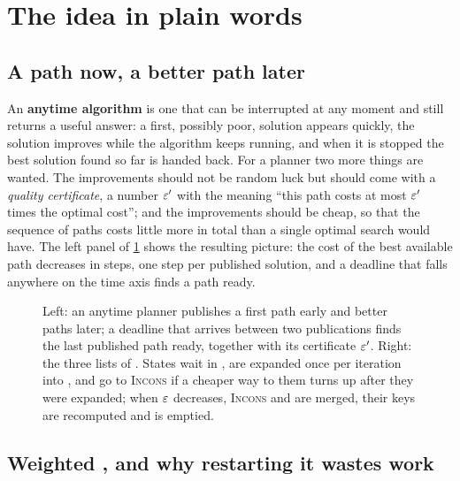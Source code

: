 \section{The idea in plain words}
\label{sec:ch06-intuition}

\subsection{A path now, a better path later}

An \textbf{anytime algorithm} is one that can be
interrupted at any moment and still returns a useful answer: a first, possibly
poor, solution appears quickly, the solution improves while the algorithm keeps
running, and when it is stopped the best solution found so far is handed back.
For a planner two more things are wanted. The improvements should not be
random luck but should come with a \emph{quality certificate}, a number
$\varepsilon'$ with the meaning ``this path costs at most $\varepsilon'$ times the optimal
cost''; and the improvements should be cheap, so that the sequence of paths
costs little more in total than a single optimal search would have. The left
panel of \cref{fig:ch06-idea} shows the resulting picture: the cost of the best
available path decreases in steps, one step per published solution, and a
deadline that falls anywhere on the time axis finds a path ready.

\begin{figure}[tb]
  \centering
  \caption{Left: an anytime planner publishes a first path early and better
  paths later; a deadline that arrives between two publications finds the last
  published path ready, together with its certificate $\varepsilon'$. Right: the three
  lists of \arastar. States wait in \Open, are expanded once per iteration into
  \Closed, and go to \textsc{Incons} if a cheaper way to them turns up after
  they were expanded; when $\varepsilon$ decreases, \textsc{Incons} and \Open are
  merged, their keys are recomputed and \Closed is emptied.}
  \label{fig:ch06-idea}
\end{figure}

\subsection{Weighted \astar, and why restarting it wastes work}
\label{sec:ch06-restart}


